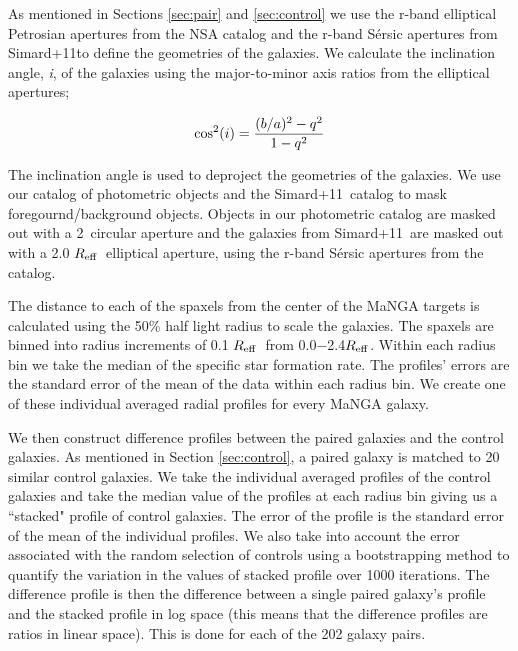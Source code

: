 \documentclass[iop,revtex4,twocolumn,apj,numberedappendix,appendixfloats]{emulateapj}
\newcommand{\reff}{$R_{\rm eff}$}
\newcommand{\simard}{Simard+11}
\begin{document}
As mentioned in Sections \ref{sec:pair} and \ref{sec:control} we use the r-band elliptical Petrosian apertures from the NSA catalog and the r-band S\'ersic apertures from \simard to define the geometries of the galaxies. We calculate the inclination angle, {\it i}, of the galaxies using the major-to-minor axis ratios from the elliptical apertures;

\begin{equation}
{\rm cos^2}(i) = \frac{(b/a)^2 - q^2}{1 - q^2}
\end{equation}

The inclination angle is used to deproject the geometries of the galaxies. We use our catalog of photometric objects and the \simard\ catalog to mask foregournd/background objects. Objects in our photometric catalog are masked out with a 2\arcsec\ circular aperture and the galaxies from \simard\ are masked out with a 2.0 \reff\ elliptical aperture, using the r-band S\'ersic apertures from the catalog. 

The distance to each of the spaxels from the center of the MaNGA targets is calculated using the 50\% half light radius to scale the galaxies. The spaxels are binned into radius increments of 0.1 \reff\ from 0.0$-$2.4\reff. Within each radius bin we take the median of the specific star formation rate. The profiles' errors are the standard error of the mean of the data within each radius bin. We create one of these individual averaged radial profiles for every MaNGA galaxy. 

We then construct difference profiles between the paired galaxies and the control galaxies. As mentioned in Section \ref{sec:control}, a paired galaxy is matched to 20 similar control galaxies. We take the individual averaged profiles of the control galaxies and take the median value of the profiles at each radius bin giving us a ``stacked" profile of control galaxies. The error of the profile is the standard error of the mean of the individual profiles. We also take into account the error associated with the random selection of controls using a bootstrapping method to quantify the variation in the values of stacked profile over 1000 iterations. The difference profile is then the difference between a single paired galaxy's profile and the stacked profile in log space (this means that the difference profiles are ratios in linear space). This is done for each of the 202 galaxy pairs. 


\end{document}
